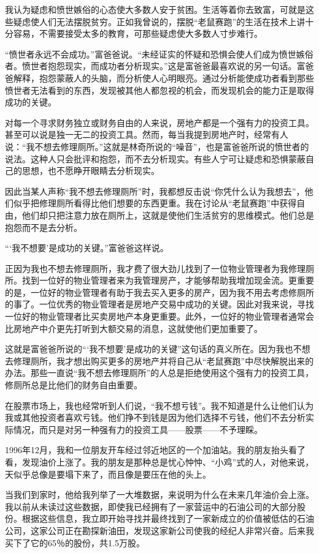 我认为疑虑和愤世嫉俗的心态使大多数人安于贫困。生活等着你去致富，可就是这些疑虑使人们无法摆脱贫穷。正如我曾说的，摆脱“老鼠赛跑”的生活在技术上讲十分容易，不需要接受太多的教育，可那些疑虑使大多数人寸步难行。

“愤世者永远不会成功。”富爸爸说。“未经证实的怀疑和恐惧会使人们成为愤世嫉俗者。愤世者抱怨现实，而成功者分析现实。”这是富爸爸最喜欢说的另一句话。富爸爸解释，抱怨蒙蔽人的头脑，而分析使人心明眼亮。通过分析能使成功者看到那些愤世者无法看到的东西，发现被其他人都忽视的机会，而发现机会的能力正是取得成功的关键。

对每一个寻求财务独立或财务自由的人来说，房地产都是一个强有力的投资工具。甚至可以说是独一无二的投资工具。然而，每当我提到房地产时，经常有人说：“我不想去修理厕所。”这就是林奇所说的“噪音”，也是富爸爸所说的愤世者的说法。这种人只会批评和抱怨，而不去分析现实。有些人宁可让疑虑和恐惧蒙蔽自己的思想，也不愿睁开眼睛去分析现实。

因此当某人声称“我不想去修理厕所”时，我都想反击说“你凭什么认为我想去”，他们似乎把修理厕所看得比他们想要的东西更重。我在讨论从“老鼠赛跑”中获得自由，他们却只把注意力放在厕所上，这就是使他们生活贫穷的思维模式。他们总是抱怨而不是去分析。

“‘我不想要’是成功的关键。”富爸爸这样说。

正因为我也不想去修理厕所，我才费了很大劲儿找到了一位物业管理者为我修理厕所。找到一位好的物业管理者来为我管理房产，才能够帮助我增加现金流。更重要的是，一位好的物业管理者有助于我去买入更多的房产，因为我不用去考虑修厕所的事了。一位优秀的物业管理者是房地产交易中成功的关键。因此对我来说，寻找一位好的物业管理者比买卖房地产本身更重要。此外，一位好的物业管理者通常会比房地产中介更先打听到大额交易的消息，这就使他们更加重要了。

这就是富爸爸所说的“‘我不想要’是成功的关键”这句话的真义所在。因为我也不想去修理厕所，我才想出购买更多的房地产并将自己从“老鼠赛跑”中尽快解脱出来的办法。那些一直说“我不想去修理厕所”的人总是拒绝使用这个强有力的投资工具，修厕所总是比他们的财务自由重要。

在股票市场上，我也经常听到人们说，“我不想亏钱”。我不知道是什么让他们认为我或其他投资者喜欢亏钱。他们挣不到钱是因为他们选择不亏钱，他们不去分析实际情况，而只是对另一种强有力的投资工具——股票——不予理睬。

1996年12月，我和一位朋友开车经过邻近地区的一个加油站。我的朋友抬头看了看，发现油价上涨了。我的朋友是那种总是忧心忡忡、“小鸡”式的人，对他来说，天似乎总像是要塌下来了，而且像是要压在他的头上。

当我们到家时，他给我列举了一大堆数据，来说明为什么在未来几年油价会上涨。我以前从未读过这些数据，即使我已经拥有了一家营运中的石油公司的大部分股份。根据这些信息，我立即开始寻找并最终找到了一家新成立的价值被低估的石油公司，这家公司正在勘探新油田，发现这家新公司使我的经纪人非常兴奋。后来我买下了它的65％的股份，共1.5万股。

